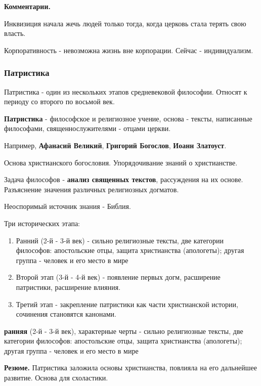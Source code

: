 \documentclass{article}
\begin{document}
\begin{flushleft}
\textbf{Комментарии.}

\hfill

Инквизиция начала жечь людей только тогда, когда церковь стала терять свою власть.

Корпоративность - невозможна жизнь вне корпорации. Сейчас - индивидуализм.

\subsubsection{Патристика}

Патристика - один из нескольких этапов средневековой философии. Относят к периоду со второго по восьмой век.

\textbf{Патристика} - философское и религиозное учение, основа - тексты, написанные философами, священнослужителями - отцами церкви.

Например, \textbf{Афанасий Великий}, \textbf{Григорий Богослов}, \textbf{Иоанн Златоуст}.

Основа христианского богословия. Упорядочивание знаний о христианстве.

Задача философов - \textbf{анализ священных текстов}, рассуждения на их основе. Разъяснение значения различных религиозных догматов.

Неоспоримый источник знания - Библия.

Три исторических этапа:

\begin{enumerate}
    \item Ранний (2-й - 3-й век) - сильно религиозные тексты, две категории философов: апостольские отцы, защита христианства (апологеты); другая группа - человек и его место в мире
    \item Второй этап (3-й - 4-й век) - появление первых догм, расширение патристики, расширение влияния.
    \item Третий этап - закрепление патристики как части христианской истории, сочинения становятся канонами.
\end{enumerate}
\textbf{ранняя} (2-й - 3-й век), характерные черты - сильно религиозные тексты, две категории философов: апостольские отцы, защита христианства (апологеты); другая группа - человек и его место в мире

\hfill

\textbf{Резюме.} Патристика заложила основы христианства, повлияла на его дальнейшее развитие. Основа для схоластики.

\end{flushleft}
\end{document}
